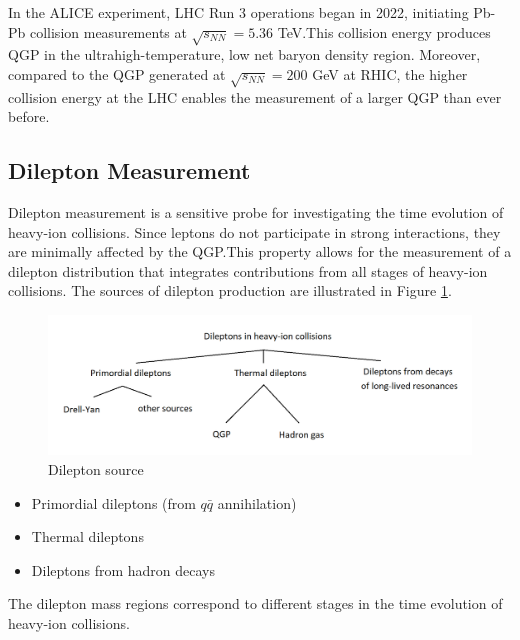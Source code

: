         In the ALICE experiment, LHC Run 3 operations began in 2022, initiating Pb-Pb collision measurements at $\sqrt{s_{NN}} = 5.36$ TeV.\@ This collision energy produces QGP in the ultrahigh-temperature, low net baryon density region. Moreover, compared to the QGP generated at $\sqrt{s_{NN}} = 200$ GeV at RHIC, the higher collision energy at the LHC enables the measurement of a larger QGP than ever before.
    \subsection{Dilepton Measurement}
        Dilepton measurement is a sensitive probe for investigating the time evolution of heavy-ion collisions. Since leptons do not participate in strong interactions, they are minimally affected by the QGP.\@ This property allows for the measurement of a dilepton distribution that integrates contributions from all stages of heavy-ion collisions. The sources of dilepton production are illustrated in Figure \ref{Intro:Dilepton:dilepton_source}.
        \begin{figure}[hbtp]
            \centering
            \includegraphics[keepaspectratio, scale=0.3]{fig/1_5_dilepton_source.png}
            \caption{Dilepton source\cite{Geurts:2022xmk}}
            \label{Intro:Dilepton:dilepton_source}
        \end{figure}
        \begin{itemize}
            \item Primordial dileptons (from \(q\bar{q}\) annihilation)
            \item Thermal dileptons
            \item Dileptons from hadron decays
        \end{itemize} 
        The dilepton mass regions correspond to different stages in the time evolution of heavy-ion collisions.
